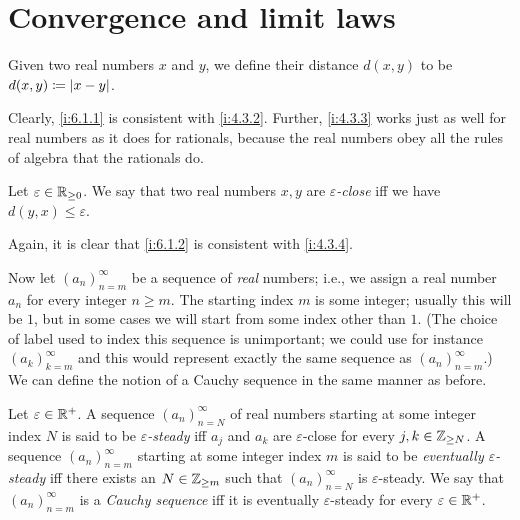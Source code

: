 \section{Convergence and limit laws}\label{i:sec:6.1}

\begin{defn}\label{i:6.1.1}
  Given two real numbers \(x\) and \(y\), we define their distance \(d(x, y)\) to be \(d(x, y) \coloneqq \left\lvert x - y\right\rvert\).
\end{defn}

\begin{note}
  Clearly, \cref{i:6.1.1} is consistent with \cref{i:4.3.2}.
  Further, \cref{i:4.3.3} works just as well for real numbers as it does for rationals, because the real numbers obey all the rules of algebra that the rationals do.
\end{note}

\begin{defn}\label{i:6.1.2}
  Let \(\varepsilon \in \mathbb{R}_{\geq 0}\).
  We say that two real numbers \(x, y\) are \emph{\(\varepsilon\)-close} iff we have \(d(y, x) \leq \varepsilon\).
\end{defn}

\begin{note}
  Again, it is clear that \cref{i:6.1.2} is consistent with \cref{i:4.3.4}.
\end{note}

\begin{note}
  Now let \((a_n)_{n = m}^\infty\) be a sequence of \emph{real} numbers;
  i.e., we assign a real number \(a_n\) for every integer \(n \geq m\).
  The starting index \(m\) is some integer;
  usually this will be \(1\), but in some cases we will start from some index other than \(1\).
  (The choice of label used to index this sequence is unimportant; we could use for instance \((a_k)_{k = m}^{\infty}\) and this would represent exactly the same sequence as \((a_n)_{n = m}^{\infty}\).)
  We can define the notion of a Cauchy sequence in the same manner as before.
\end{note}

\begin{defn}\label{i:6.1.3}
  Let \(\varepsilon \in \mathbb{R}^+\).
  A sequence \((a_n)_{n = N}^\infty\) of real numbers starting at some integer index \(N\) is said to be \emph{\(\varepsilon\)-steady} iff \(a_j\) and \(a_k\) are \(\varepsilon\)-close for every \(j, k \in \mathbb{Z}_{\geq N}\).
  A sequence \((a_n)_{n = m}^\infty\) starting at some integer index \(m\) is said to be \emph{eventually \(\varepsilon\)-steady} iff there exists an \(N \in \mathbb{Z}_{\geq m}\) such that \((a_n)_{n = N}^\infty\) is \(\varepsilon\)-steady.
  We say that \((a_n)_{n = m}^\infty\) is a \emph{Cauchy sequence} iff it is eventually \(\varepsilon\)-steady for every \(\varepsilon \in \mathbb{R}^+\).
\end{defn}


